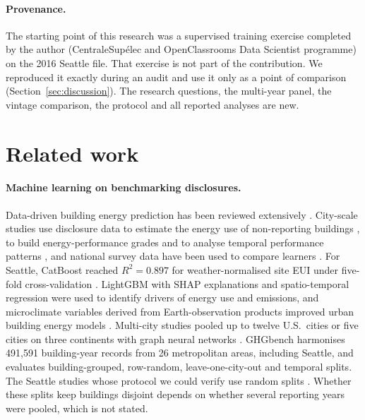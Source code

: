 \documentclass[11pt]{article}
\begin{document}
\paragraph{Provenance.} The starting point of this research was a supervised training exercise completed by the author (CentraleSupélec and OpenClassrooms Data Scientist programme) on the 2016 Seattle file. That exercise is not part of the contribution. We reproduced it exactly during an audit and use it only as a point of comparison (Section~\ref{sec:discussion}). The research questions, the multi-year panel, the vintage comparison, the protocol and all reported analyses are new.

\section{Related work}
\label{sec:related}

\paragraph{Machine learning on benchmarking disclosures.} Data-driven building energy prediction has been reviewed extensively \cite{amasyali2018review}. City-scale studies use disclosure data to estimate the energy use of non-reporting buildings \cite{kontokosta2017citywide}, to build energy-performance grades \cite{papadopoulos2019grading,arjunan2022beem} and to analyse temporal performance patterns \cite{papadopoulos2018pattern}, and national survey data have been used to compare learners \cite{robinson2017commercial}. For Seattle, CatBoost reached $R^2=0.897$ for weather-normalised site EUI under five-fold cross-validation \cite{pan2020data}. LightGBM with SHAP explanations \cite{zhang2023xai} and spatio-temporal regression \cite{zhang2023gtwr} were used to identify drivers of energy use and emissions, and microclimate variables derived from Earth-observation products improved urban building energy models \cite{worthy2025eo}. Multi-city studies pooled up to twelve U.S.\ cities \cite{li2024generalized} or five cities on three continents with graph neural networks \cite{yap2025revealing}. GHGbench \cite{duan2026ghgbench} harmonises 491{,}591 building-year records from 26 metropolitan areas, including Seattle, and evaluates building-grouped, row-random, leave-one-city-out and temporal splits. The Seattle studies whose protocol we could verify use random splits \cite{pan2020data,yap2025revealing}. Whether these splits keep buildings disjoint depends on whether several reporting years were pooled, which is not stated.
\end{document}
